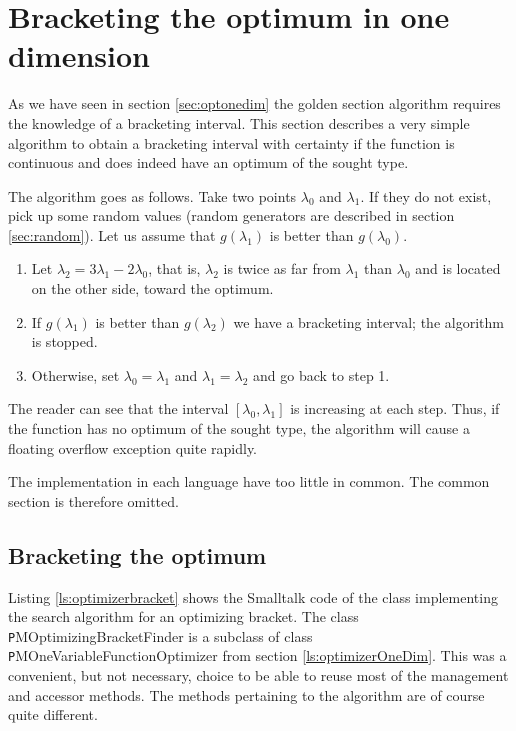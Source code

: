 \section{Bracketing the optimum in one dimension}
\label{sec:bracket} As we have seen in section \ref{sec:optonedim}
the golden section algorithm requires the knowledge of a
bracketing interval. This section describes a very simple
algorithm to obtain a bracketing interval with certainty if the
function is continuous and does indeed have an optimum of the
sought type.

The algorithm goes as follows. Take two points $\lambda_0$ and
$\lambda_1$. If they do not exist, pick up some random values
(random generators are described in section \ref{sec:random}). Let
us assume that $g\left(\lambda_1\right)$ is better than
$g\left(\lambda_0\right)$.
\begin{enumerate}
  \item Let $\lambda_2=3\lambda_1-2\lambda_0$, that is, $\lambda_2$ is twice as far from $\lambda_1$ than
$\lambda_0$ and is located on the other side, toward the optimum.
  \item If $g\left(\lambda_1\right)$ is better than
$g\left(\lambda_2\right)$ we have a bracketing interval; the
algorithm is stopped.
  \item Otherwise, set $\lambda_0=\lambda_1$ and $\lambda_1=\lambda_2$ and go back to step 1.
\end{enumerate}
The reader can see that the interval
$\left[\lambda_0,\lambda_1\right]$ is increasing at each step.
Thus, if the function has no optimum of the sought type, the
algorithm will cause a floating overflow exception quite rapidly.

\noindent The implementation in each language have too little in
common. The common section is therefore omitted.

\subsection{Bracketing the optimum}
Listing \ref{ls:optimizerbracket} shows the Smalltalk code of the class
implementing the search algorithm for an optimizing bracket. The
class {\texttt PMOptimizingBracketFinder} is a subclass of class {\texttt
PMOneVariableFunctionOptimizer} from section
\ref{ls:optimizerOneDim}. This was a convenient, but not
necessary, choice to be able to reuse most of the management and
accessor methods. The methods pertaining to the algorithm are of
course quite different.

